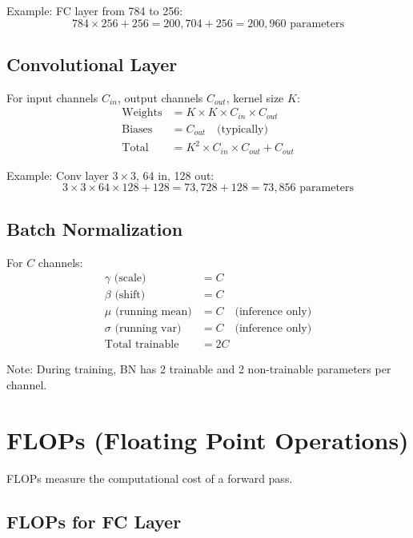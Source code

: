 Example: FC layer from 784 to 256:
\begin{equation}
784 \times 256 + 256 = 200,704 + 256 = 200,960 \text{ parameters}
\end{equation}

\subsection{Convolutional Layer}

For input channels $C_{in}$, output channels $C_{out}$, kernel size $K$:
\begin{align}
\text{Weights} &= K \times K \times C_{in} \times C_{out} \\
\text{Biases} &= C_{out} \quad \text{(typically)} \\
\text{Total} &= K^2 \times C_{in} \times C_{out} + C_{out}
\end{align}

Example: Conv layer $3\times3$, 64 in, 128 out:
\begin{equation}
3 \times 3 \times 64 \times 128 + 128 = 73,728 + 128 = 73,856 \text{ parameters}
\end{equation}

\subsection{Batch Normalization}

For $C$ channels:
\begin{align}
\gamma \text{ (scale)} &= C \\
\beta \text{ (shift)} &= C \\
\mu \text{ (running mean)} &= C \quad \text{(inference only)} \\
\sigma \text{ (running var)} &= C \quad \text{(inference only)} \\
\text{Total trainable} &= 2C
\end{align}

Note: During training, BN has 2 trainable and 2 non-trainable parameters per channel.

\section{FLOPs (Floating Point Operations)}

FLOPs measure the computational cost of a forward pass.

\subsection{FLOPs for FC Layer}

